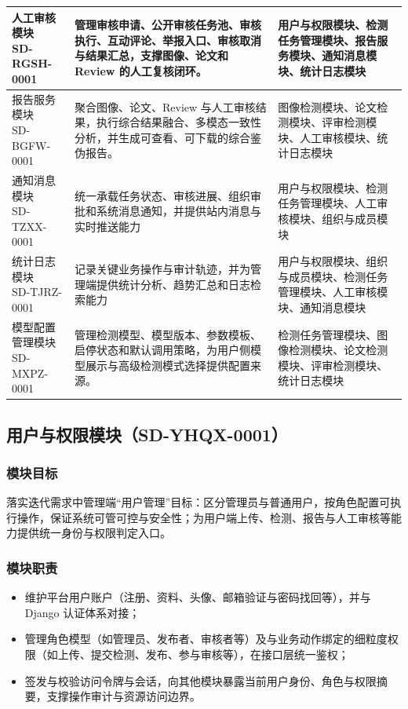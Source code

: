 \begin{longtable}{|p{3.8cm}|p{6.1cm}|p{4.1cm}|}
\shortstack[l]{人工审核模块\\SD-RGSH-0001} & 管理审核申请、公开审核任务池、审核执行、互动评论、举报入口、审核取消与结果汇总，支撑图像、论文和 Review 的人工复核闭环。 & 用户与权限模块、检测任务管理模块、报告服务模块、通知消息模块、统计日志模块 \\ \hline
\shortstack[l]{报告服务模块\\SD-BGFW-0001} & 聚合图像、论文、Review 与人工审核结果，执行综合结果融合、多模态一致性分析，并生成可查看、可下载的综合鉴伪报告。 & 图像检测模块、论文检测模块、评审检测模块、人工审核模块、统计日志模块 \\ \hline
\shortstack[l]{通知消息模块\\SD-TZXX-0001} & 统一承载任务状态、审核进展、组织审批和系统消息通知，并提供站内消息与实时推送能力 & 用户与权限模块、检测任务管理模块、人工审核模块、组织与成员模块 \\ \hline
\shortstack[l]{统计日志模块\\SD-TJRZ-0001} & 记录关键业务操作与审计轨迹，并为管理端提供统计分析、趋势汇总和日志检索能力 & 用户与权限模块、组织与成员模块、检测任务管理模块、人工审核模块、通知消息模块 \\ \hline
\shortstack[l]{模型配置管理模块\\SD-MXPZ-0001} & 管理检测模型、模型版本、参数模板、启停状态和默认调用策略，为用户侧模型展示与高级检测模式选择提供配置来源。 & 检测任务管理模块、图像检测模块、论文检测模块、评审检测模块、统计日志模块 \\ \hline
\end{longtable}

\subsection{用户与权限模块（SD-YHQX-0001）}

\subsubsection{模块目标}
落实迭代需求中管理端“用户管理”目标：区分管理员与普通用户，按角色配置可执行操作，保证系统可管可控与安全性；为用户端上传、检测、报告与人工审核等能力提供统一身份与权限判定入口。

\subsubsection{模块职责}
\begin{itemize}[leftmargin=2em]
    \item 维护平台用户账户（注册、资料、头像、邮箱验证与密码找回等），并与 Django 认证体系对接；
    \item 管理角色模型（如管理员、发布者、审核者等）及与业务动作绑定的细粒度权限（如上传、提交检测、发布、参与审核等），在接口层统一鉴权；
    \item 签发与校验访问令牌与会话，向其他模块暴露当前用户身份、角色与权限摘要，支撑操作审计与资源访问边界。
\end{itemize}

